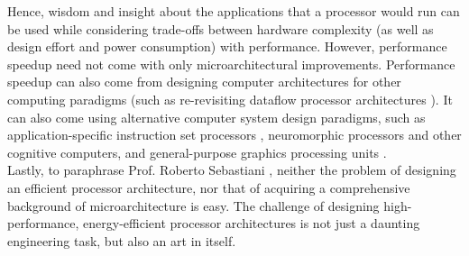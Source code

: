 Hence, wisdom and insight about the applications that a processor would run can be used while considering trade-offs between hardware complexity (as well as design effort and power consumption) with performance. However, performance speedup need not come with only microarchitectural improvements. Performance speedup can also come from designing computer architectures for other computing paradigms (such as re-revisiting dataflow processor architectures \cite{Dennis1974}). It can also come using alternative computer system design paradigms, such as application-specific instruction set processors \cite{Gries2005,Karuri2011,Schliebusch2007}, neuromorphic processors \cite{Benjamin2014,Misra2010,Merolla2011,Seo2011,Kim2014,Kim2013a} and other cognitive computers, and general-purpose graphics processing units \cite{Altman2011,Kim2012,Kirk2010}. \\

Lastly, to paraphrase Prof. Roberto Sebastiani \cite{Sebastiani2007a}, neither the problem of designing an efficient processor architecture, nor that of acquiring a comprehensive background of microarchitecture is easy. The challenge of designing high-performance, energy-efficient processor architectures is not just a daunting engineering task, but also an art in itself.























